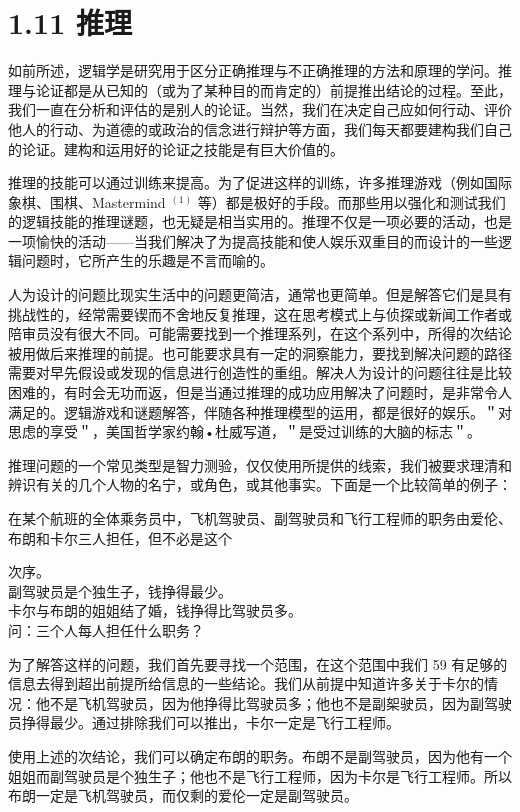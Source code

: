 \section*{1.11 推理}
如前所述，逻辑学是研究用于区分正确推理与不正确推理的方法和原理的学问。推理与论证都是从已知的（或为了某种目的而肯定的）前提推出结论的过程。至此，我们一直在分析和评估的是别人的论证。当然，我们在决定自己应如何行动、评价他人的行动、为道德的或政治的信念进行辩护等方面，我们每天都要建构我们自己的论证。建构和运用好的论证之技能是有巨大价值的。

推理的技能可以通过训练来提高。为了促进这样的训练，许多推理游戏（例如国际象棋、围棋、Mastermind ${ }^{(1)}$ 等）都是极好的手段。而那些用以强化和测试我们的逻辑技能的推理谜题，也无疑是相当实用的。推理不仅是一项必要的活动，也是一项愉快的活动——当我们解决了为提高技能和使人娱乐双重目的而设计的一些逻辑问题时，它所产生的乐趣是不言而喻的。

人为设计的问题比现实生活中的问题更简洁，通常也更简单。但是解答它们是具有挑战性的，经常需要锲而不舍地反复推理，这在思考模式上与侦探或新闻工作者或陪审员没有很大不同。可能需要找到一个推理系列，在这个系列中，所得的次结论被用做后来推理的前提。也可能要求具有一定的洞察能力，要找到解决问题的路径需要对早先假设或发现的信息进行创造性的重组。解决人为设计的问题往往是比较困难的，有时会无功而返，但是当通过推理的成功应用解决了问题时，是非常令人满足的。逻辑游戏和谜题解答，伴随各种推理模型的运用，都是很好的娱乐。＂对思虑的享受＂，美国哲学家约翰•杜威写道，＂是受过训练的大脑的标志＂。

推理问题的一个常见类型是智力测验，仅仅使用所提供的线索，我们被要求理清和辨识有关的几个人物的名宁，或角色，或其他事实。下面是一个比较简单的例子：

在某个航班的全体乘务员中，飞机驾驶员、副驾驶员和飞行工程师的职务由爱伦、布朗和卡尔三人担任，但不必是这个

次序。\\
副驾驶员是个独生子，钱挣得最少。\\
卡尔与布朗的姐姐结了婚，钱挣得比驾驶员多。\\
问：三个人每人担任什么职务？

为了解答这样的问题，我们首先要寻找一个范围，在这个范围中我们 59 有足够的信息去得到超出前提所给信息的一些结论。我们从前提中知道许多关于卡尔的情况：他不是飞机驾驶员，因为他挣得比驾驶员多；他也不是副桇驶员，因为副驾驶员挣得最少。通过排除我们可以推出，卡尔一定是飞行工程师。

使用上述的次结论，我们可以确定布朗的职务。布朗不是副驾驶员，因为他有一个姐姐而副驾驶员是个独生子；他也不是飞行工程师，因为卡尔是飞行工程师。所以布朗一定是飞机驾驶员，而仅剩的爱伦一定是副驾驶员。

